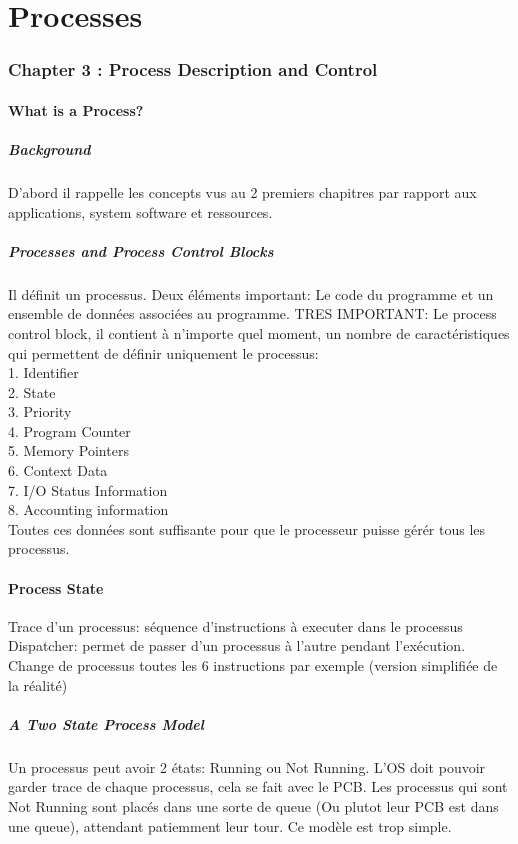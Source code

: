 \part{Processes}

\section{Chapter 3 : Process Description and Control}

\subsection{What is a Process?}
\subsubsection{Background}
D'abord il rappelle les concepts vus au 2 premiers chapitres par rapport aux applications, system software et ressources.
\subsubsection{Processes and Process Control Blocks}
Il définit un processus.
Deux éléments important: Le code du programme et un ensemble de données associées au programme.
TRES IMPORTANT: Le process control block, il contient à n'importe quel moment, un nombre de caractéristiques qui permettent de définir uniquement le processus: \\
1. Identifier \\
2. State \\
3. Priority \\
4. Program Counter \\
5. Memory Pointers \\
6. Context Data \\
7. I/O Status Information \\
8. Accounting information \\
Toutes ces données sont suffisante pour que le processeur puisse gérér tous les processus.

\subsection{Process State}
Trace d'un processus: séquence d'instructions à executer dans le processus Dispatcher: permet de passer d'un processus à l'autre pendant l'exécution.
Change de processus toutes les 6 instructions par exemple (version simplifiée de la réalité)
\subsubsection{A Two State Process Model}
Un processus peut avoir 2 états: Running ou Not Running.
L'OS doit pouvoir garder trace de chaque processus, cela se fait avec le PCB.
Les processus qui sont Not Running sont placés dans une sorte de queue (Ou plutot leur PCB est dans une queue), attendant patiemment leur tour.
Ce modèle est trop simple.
